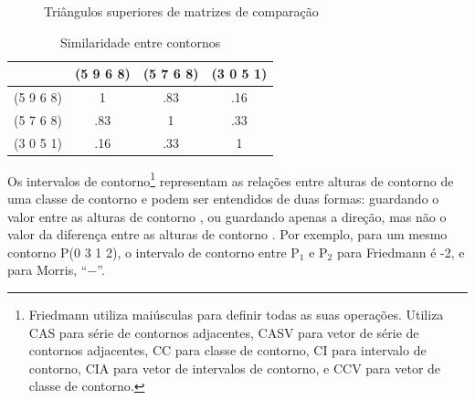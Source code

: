 \begin{figure}
  \qquad
  \qquad
  \caption{Triângulos superiores de matrizes de comparação}
  \label{fig:triangulos-com-matrix}
\end{figure}

\begin{table}
  \vspace{2em}
  \centering
    \begin{tabular}{c|ccc}
      & (5 9 6 8) & (5 7 6 8) & (3 0 5 1) \\
      \hline
      (5 9 6 8) & 1 & .83 & .16 \\
      (5 7 6 8) & .83 & 1 & .33 \\
      (3 0 5 1) & .16 & .33 & 1
    \end{tabular}
    \caption{Similaridade entre contornos}
  \label{tab:similaridade-contornos}
\end{table}

Os intervalos de contorno\footnote{Friedmann utiliza maiúsculas para
  definir todas as suas operações. Utiliza CAS para
  série de contornos adjacentes, CASV para vetor de série de contornos
  adjacentes, CC para classe de contorno, CI para intervalo de
  contorno, CIA para vetor de intervalos de contorno, e CCV para vetor
  de classe de contorno.}  representam as relações entre alturas de
contorno de uma classe de contorno e podem ser entendidos de duas
formas: guardando o valor entre as alturas de contorno
\cite{friedmann85:methodology}, ou guardando apenas a direção, mas não
o valor da diferença entre as alturas de contorno
\cite{morris93:directions}. Por exemplo, para um mesmo contorno P(0 3
1 2), o intervalo de contorno entre P$_1$ e P$_2$ para Friedmann é -2,
e para Morris, ``$-$''.

